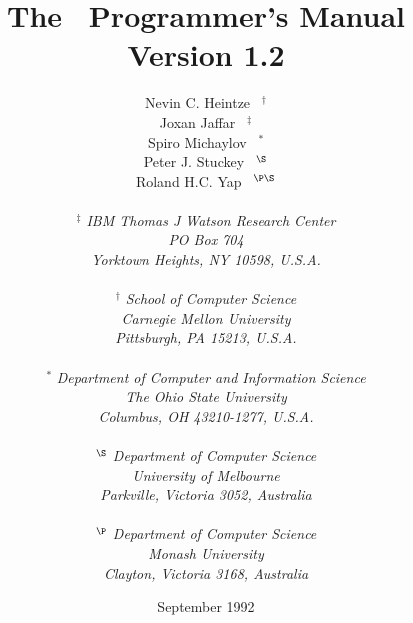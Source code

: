 \makeindex

\pagestyle{empty}

\title{\bf The \CLPR\ Programmer's Manual \\ Version 1.2}
\author{
{\sc Nevin C. Heintze} \ $^{\dag}$ \\
{\sc Joxan Jaffar} \ $^{\ddag}$ \\ 
{\sc Spiro Michaylov} \ $^{*}$ \\
{\sc Peter J. Stuckey} \ $^{\S}$ \\
{\sc Roland H.C. Yap} \ $^{\P\S}$ \\ \ \\
$^{\ddag}$ 
{\normalsize\em IBM Thomas J Watson Research Center} \\
{\normalsize\em PO Box 704} \\
{\normalsize\em Yorktown Heights, NY 10598, U.S.A.}
\\ \ \\
$^{\dag}$ 
{\normalsize\em School of Computer Science} \\
{\normalsize\em Carnegie Mellon University} \\
{\normalsize\em Pittsburgh, PA 15213, U.S.A.}
\\ \ \\
$^{*}$
{\normalsize\em Department of Computer and Information Science} \\
{\normalsize\em The Ohio State University} \\
{\normalsize\em Columbus, OH 43210-1277, U.S.A.}
\\ \ \\
$^{\S}$ 
{\normalsize\em Department of Computer Science} \\
{\normalsize\em University of Melbourne} \\ 
{\normalsize\em Parkville, Victoria 3052, Australia}
\\ \ \\
$^{\P}$ 
{\normalsize\em Department of Computer Science} \\
{\normalsize\em Monash University} \\ 
{\normalsize\em Clayton, Victoria 3168, Australia}
}
\date{September 1992}
\maketitle
\pagestyle{headings}

{}
\tableofcontents

